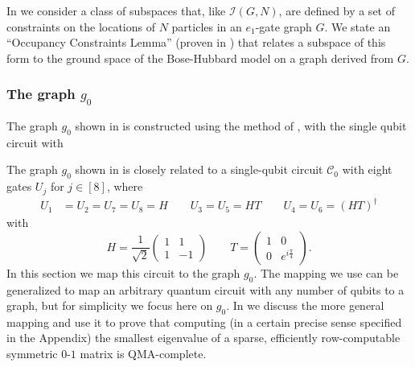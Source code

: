 \documentclass[../thesis-main/thesis-main]{subfiles}
\begin{document}
In  we consider a class of subspaces that, like $\mathcal{I}(G,N)$, are defined by a set of constraints on the locations of $N$ particles in an $e_{1}$-gate graph $G$. We state an ``Occupancy Constraints Lemma'' (proven in ) that relates a subspace of this form to the ground space of the Bose-Hubbard model on a graph derived from $G$.


\subsubsection{The graph $g_0$}

The graph $g_{0}$ shown in  is constructed using the method of , with the single qubit circuit with 

The graph $g_{0}$ shown in  is closely related to a single-qubit circuit $\mathcal{C}_{0}$ with eight gates $U_{j}$ for $j\in[8]$, where 
\begin{align*}
U_{1} & =U_{2}=U_{7}=U_{8}=H\qquad U_{3}=U_{5}=HT\qquad U_{4}=U_{6}=\left(HT\right)^{\dagger}
\end{align*}
with 
\[
H=\frac{1}{\sqrt{2}}\begin{pmatrix}
1 & 1\\
1 & -1
\end{pmatrix}\qquad T=\begin{pmatrix}
1 & 0\\
0 & e^{i\frac{\pi}{4}}
\end{pmatrix}.
\]
In this section we map this circuit to the graph $g_{0}$. The mapping we use can be generalized to map an arbitrary quantum circuit with any number of qubits to a graph, but for simplicity we focus here on $g_{0}$. In  we discuss the more general mapping and use it to prove that computing (in a certain precise sense specified in the Appendix) the smallest eigenvalue of a sparse, efficiently row-computable symmetric $0$-$1$ matrix is QMA-complete.
\end{document}
